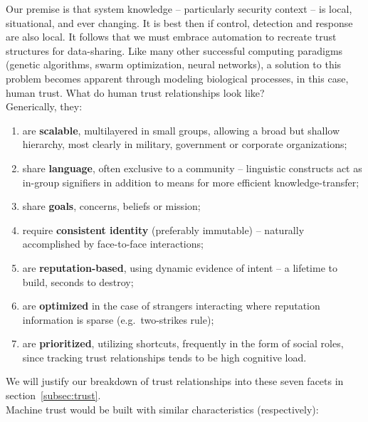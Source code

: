 Our premise is that system knowledge -- particularly security context -- is local, situational, and ever changing.
It is best then if control, detection and response are also local.
It follows that we must embrace automation to recreate trust structures for data-sharing.
Like many other successful computing paradigms (genetic algorithms, swarm optimization, neural networks), a solution to this problem becomes apparent through modeling biological processes, in this case, human trust.
What do human trust relationships look like?
\\Generically, they:
\begin{enumerate}
	\item are \textbf{scalable}, multilayered in small groups, allowing a broad but shallow hierarchy, most clearly in military, government or corporate organizations; \label{scale}
	\item share \textbf{language}, often exclusive to a community -- linguistic constructs act as in-group signifiers in addition to means for more efficient knowledge-transfer; \label{language}
	\item share \textbf{goals}, concerns, beliefs or mission; \label{mission}
	\item require \textbf{consistent identity} (preferably immutable) -- naturally accomplished by face-to-face interactions; \label{identity}
	\item are \textbf{reputation-based}, using dynamic evidence of intent -- a lifetime to build, seconds to destroy; \label{reputation}
	\item are \textbf{optimized} in the case of strangers interacting where reputation information is sparse (e.g.\ two-strikes rule); \label{optimized}
	\item are \textbf{prioritized}, utilizing shortcuts, frequently in the form of social roles, since tracking trust relationships tends to be high cognitive load. \label{priorities}
\end{enumerate}
We will justify our breakdown of trust relationships into these seven facets in section~\ref{subsec:trust}.
\\[10pt]
Machine trust would be built with similar characteristics (respectively):
